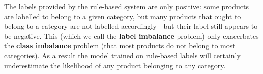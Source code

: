 The labels provided by the rule-based system are only positive:  some products are labelled to belong to a given category, but many products that ought to belong to a category are not labelled  accordingly -  but their label still appears to be negative.
This (which we call the \textbf{label imbalance} problem) only exacerbates the \textbf{class imbalance} problem (that most products do not belong to most categories).
As a result the model trained on rule-based labels will certainly underestimate the likelihood of any product belonging to any category.

%

